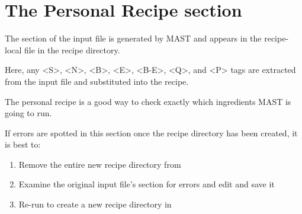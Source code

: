 \documentclass[letterpaper,10pt,english]{sphinxmanual}
\begin{document}
\section{The Personal Recipe section}
\label{3_1_4_personalrecipe:the-personal-recipe-section}\label{3_1_4_personalrecipe::doc}
The  section of the input file is generated by MAST and appears in the recipe-local  file in the recipe directory.

Here, any \textless{}S\textgreater{}, \textless{}N\textgreater{}, \textless{}B\textgreater{}, \textless{}E\textgreater{}, \textless{}B-E\textgreater{}, \textless{}Q\textgreater{}, and \textless{}P\textgreater{} tags are extracted from the input file and substituted into the recipe.

The personal recipe is a good way to check exactly which ingredients MAST is going to run.

If errors are spotted in this section once the recipe directory has been created, it is best to:
\begin{enumerate}
\item {} 
Remove the entire new recipe directory from 

\item {} 
Examine the original input file's  section for errors and edit and save it

\item {} 
Re-run  to create a new recipe directory in 

\end{enumerate}
\end{document}
